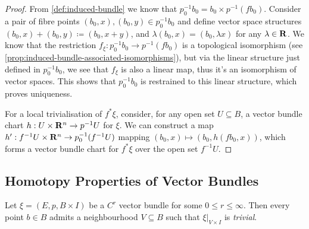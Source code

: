 \documentclass[../../../deep-dive]{subfile}
\begin{document}
\begin{proof}
    From \cref{def:induced-bundle} we know that
    \(p_0^{-1} b_0 = b_0 \times p^{-1} (f b_0)\). Consider a pair of fibre points
    \((b_0, x), (b_0, y) \in p_0^{-1} b_0\) and define vector space structures
    \((b_0, x) + (b_0, y) \coloneq (b_0, x + y)\), and
    \(\lambda (b_0, x) = (b_0, \lambda x)\) for any \(\lambda \in \mathbf{R}\). We know that
    the restriction \(f_{\xi}: p_0^{-1} b_0 \to p^{-1}(f b_0)\) is a topological
    isomorphism (see \cref{prop:induced-bundle-associated-isomorphisms}), but via
    the linear structure just defined in \(p_0^{-1} b_0\), we see that \(f_{\xi}\)
    is also a linear map, thus it's an isomorphism of vector spaces. This shows that
    \(p_0^{-1} b_0\) is restrained to this linear structure, which proves uniqueness.

    For a local trivialisation of \(f^{*} \xi\), consider, for any open set \(U
    \subseteq B\), a vector bundle chart \(h: U \times \mathbf{R}^n \to p^{-1} U\) for
    \(\xi\). We can construct a map \(h': f^{-1} U \times \mathbf{R}^n \to
    p_0^{-1}(f^{-1} U)\) mapping \((b_0, x) \mapsto (b_0, h(f b_0, x))\), which
    forms a vector bundle chart for \(f^{*} \xi\) over the open set \(f^{-1} U\).
\end{proof}

\subsection{Homotopy Properties of Vector Bundles}

\begin{lemma}
    \label{lem:local-trivialization}
    Let \(\xi = (E, p, B \times I)\) be a \(C^r\) vector bundle for some
    \(0 \leq r \leq \infty\). Then every point \(b \in B\) admits a neighbourhood
    \(V \subseteq B\) such that \(\xi|_{V \times I}\) is \emph{trivial}.
\end{lemma}
\end{document}
